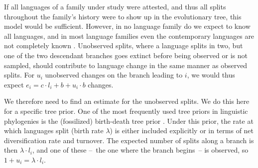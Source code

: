 \documentclass[]{rsos}%
\begin{document}
%

If all languages of a family under study were attested, and thus all splits throughout
the family's history were to show up in the evolutionary tree, this model would be sufficient.
However, in no language family do we expect to know all languages, and in most
language families even the contemporary languages are not completely known \parencite{glottoscope}. 
Unobserved splits, where a language splits in two, but one of
the two descendant branches goes extinct before being observed or is not sampled,
should contribute to language change in the same manner as observed splits.
For $u_i$ unobserved changes on the branch leading to $i$, we would thus expect $e_i = c \cdot l_i + b + u_i \cdot b$ changes.

We therefore need to find an estimate for the unobserved splits.
We do this here for a specific tree prior.
One of the most frequently used tree priors in linguistic phylogenies
is the (fossilized) birth-death tree prior \parencite{gernhard2008conditioned,stadler2010samplingthroughtime,heath2014fossilized,rama2018three}.
Under this prior, the rate at which
languages split (birth rate $\lambda$) is either included explicitly or in terms of net diversification rate and turnover.
The expected number of splits along a branch is then $\lambda \cdot l_i$, and one of these –~the one where the branch begins~– is observed, so $1 + u_i = \lambda \cdot l_i$.
\end{document}
